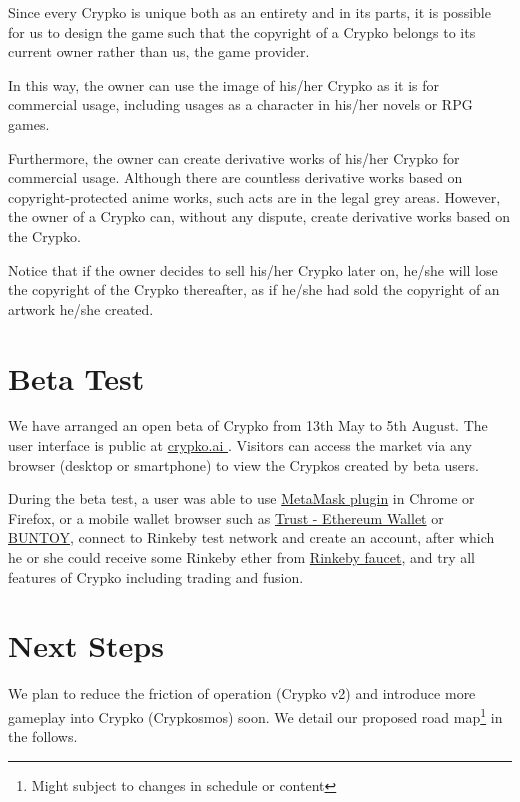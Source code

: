 \documentclass[b5paper]{article}
\begin{document}
Since every Crypko is unique both as an entirety and in its parts, it is possible for us to design the game such that the copyright of a Crypko belongs to its current owner rather than us, the game provider.

In this way, the owner can use the image of his/her Crypko as it is for commercial usage, including usages as a character in his/her novels or RPG games. 

Furthermore, the owner can create derivative works of his/her Crypko for commercial usage.
Although there are countless derivative works based on copyright-protected anime works, such acts are in the legal grey areas. However, the owner of a Crypko can, without any dispute, create derivative works based on the Crypko.

Notice that if the owner decides to sell his/her Crypko later on, he/she will lose the copyright of the Crypko thereafter, as if he/she had sold the copyright of an artwork he/she created.

\section{Beta Test}

We have arranged an open beta of Crypko from 13th May to 5th August. 
The user interface is public at \href{http://crypko.ai}{ crypko.ai }. Visitors can access the market via any browser (desktop or smartphone) to view the Crypkos created by beta users.

During the beta test, a user was able to use \href{https://metamask.io/}{MetaMask plugin} in Chrome or Firefox, or a mobile wallet browser such as \href{https://trustwalletapp.com/}{Trust - Ethereum Wallet} or \href{http://www.buntoy.com/} {BUNTOY}, connect to Rinkeby test network and create an account, after which he or she could receive some Rinkeby ether from \href{https://www.rinkeby.io/#faucet}{Rinkeby faucet}, and try all features of Crypko including trading and fusion.

\section{Next Steps}

We plan to reduce the friction of operation (Crypko v2) and introduce more gameplay into Crypko (Crypkosmos) soon.
We detail our proposed road map\footnote{Might subject to changes in schedule or content} in the follows.
\end{document}
